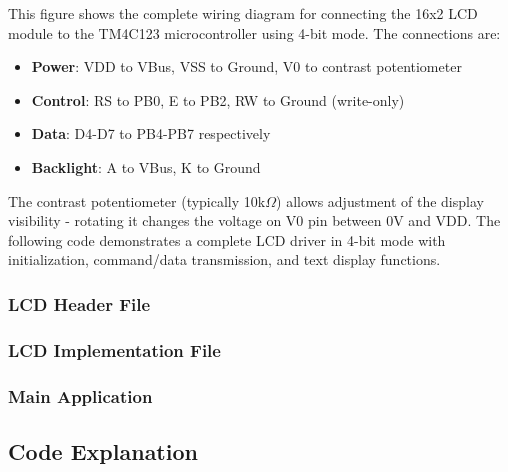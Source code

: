 \noindent This figure shows the complete wiring diagram for connecting the 16x2 LCD module to the TM4C123 microcontroller using 4-bit mode. The connections are:
\begin{itemize}[nosep]
    \item \textbf{Power}: VDD to VBus, VSS to Ground, V0 to contrast potentiometer
    \item \textbf{Control}: RS to PB0, E to PB2, RW to Ground (write-only)
    \item \textbf{Data}: D4-D7 to PB4-PB7 respectively
    \item \textbf{Backlight}: A to VBus, K to Ground
\end{itemize}

\noindent The contrast potentiometer (typically 10k$\Omega$) allows adjustment of the display visibility - rotating it changes the voltage on V0 pin between 0V and VDD.
The following code demonstrates a complete LCD driver in 4-bit mode with initialization, command/data transmission, and text display functions.
\newpage
\pagestyle{empty} %
\subsubsection{LCD Header File}


\subsubsection{LCD Implementation File}



\subsubsection{Main Application}


\pagestyle{plain} %
\subsection{Code Explanation}

